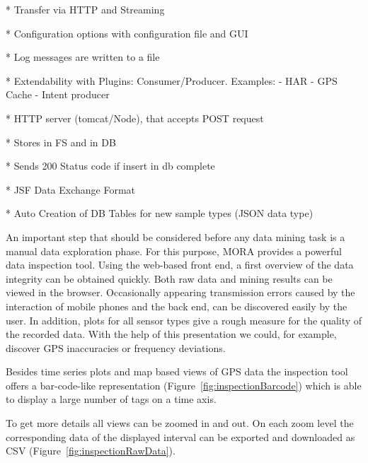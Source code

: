 \documentclass[times, 10pt,twocolumn]{article}
\begin{document}
* Transfer via HTTP and Streaming

* Configuration options with configuration file and GUI

* Log messages are written to a file

* Extendability with Plugins: Consumer/Producer. Examples:
  - HAR
  - GPS Cache
  - Intent producer


* HTTP server (tomcat/Node), that accepts POST request

* Stores in FS and in DB

* Sends 200 Status code if insert in db complete

* JSF Data Exchange Format

* Auto Creation of DB Tables for new sample types (JSON data type)


An important step that should be considered before any data mining task is a manual data exploration phase.
For this purpose, MORA provides a powerful data inspection tool.
Using the web-based front end, a first overview of the data integrity can be obtained quickly.
Both raw data and mining results can be viewed in the browser.
Occasionally appearing transmission errors caused by the interaction of mobile phones and the back end, can be discovered easily by the user.
In addition, plots for all sensor types give a rough measure for the quality of the recorded data.
With the help of this presentation we could, for example, discover GPS inaccuracies or frequency deviations.

Besides time series plots and map based views of GPS data the inspection tool offers a bar-code-like representation (Figure~\ref{fig:inspectionBarcode}) which is able to display a large number of tags on a time axis.

To get more details all views can be zoomed in and out.
On each zoom level the corresponding data of the displayed interval can be exported and downloaded as CSV (Figure~\ref{fig:inspectionRawData}).
\end{document}
